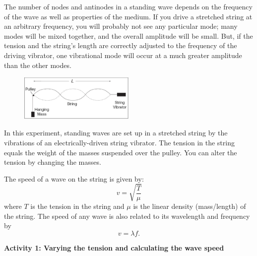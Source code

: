 The number of nodes and antinodes in a standing wave depends on the frequency of the wave as well as properties of the medium.  
If you drive a stretched string at an arbitrary frequency, you will probably not see any particular mode; many modes will be mixed together, and the overall amplitude will be small.
But, if the tension and the string's length are correctly adjusted to the frequency of the driving vibrator, one vibrational mode will occur at a much
greater amplitude than the other modes.

\begin{figure}
\vspace{-0.15in}
    \includegraphics[width=0.5\textwidth]{standing_waves_strings/standing_waves_strings_fig2_tb.eps}
\end{figure}

\vspace{0.1in}
In this experiment, standing waves are set up in a stretched string by the vibrations of an electrically-driven string vibrator. The tension in the
string equals the weight of the masses suspended over the pulley. You can alter the tension by
changing the masses. 


The speed of a wave on the string is given by:
\begin{equation*}
v=\sqrt{\frac {T}{\mu }}
\end{equation*}
where $T$ is the tension in the string and $\mu $ is the linear density (mass/length) of the string.  The speed of any wave is also related to its wavelength and frequency by
\begin{equation*}
v=\lambda f.
\end{equation*}


\textbf{Activity 1: Varying the tension and calculating the wave speed}

